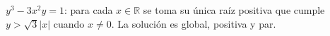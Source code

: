 $y^3-3x^2y=1$: para cada $x\in\mathbb R$ se toma su única raíz positiva que cumple $y>\sqrt3|x|$ cuando $x\ne0$. La solución es global, positiva y par.
